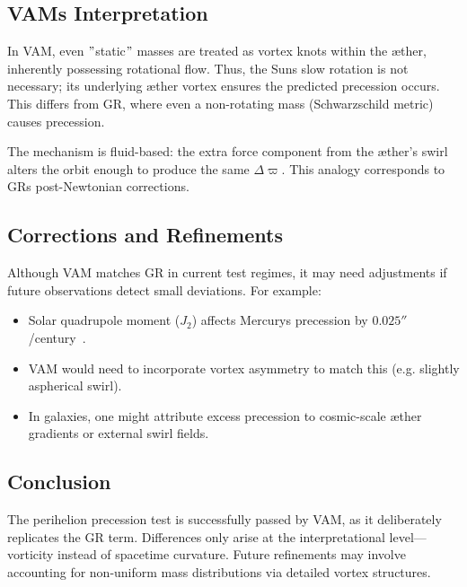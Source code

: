 \subsection*{VAM\rqs s Interpretation}
In VAM, even \("\)static\("\) masses are treated as vortex knots within the æther, inherently possessing rotational flow. Thus, the Sun\rqs s slow rotation is not necessary; its underlying æther vortex ensures the predicted precession occurs. This differs from GR, where even a non-rotating mass (Schwarzschild metric) causes precession.

The mechanism is fluid-based: the extra force component from the æther's swirl alters the orbit enough to produce the same $\Delta \varpi$. This analogy corresponds to GR\rqs s post-Newtonian corrections.

\subsection*{Corrections and Refinements}
Although VAM matches GR in current test regimes, it may need adjustments if future observations detect small deviations. For example:
\begin{itemize}
    \item Solar quadrupole moment ($J_2$) affects Mercury\rqs s precession by $0.025''$/century~\cite{sereno2006solar}.
    \item VAM would need to incorporate vortex asymmetry to match this (e.g. slightly aspherical swirl).
    \item In galaxies, one might attribute excess precession to cosmic-scale æther gradients or external swirl fields.
\end{itemize}

\subsection*{Conclusion}
The perihelion precession test is successfully passed by VAM, as it deliberately replicates the GR term. Differences only arise at the interpretational level—vorticity instead of spacetime curvature. Future refinements may involve accounting for non-uniform mass distributions via detailed vortex structures.